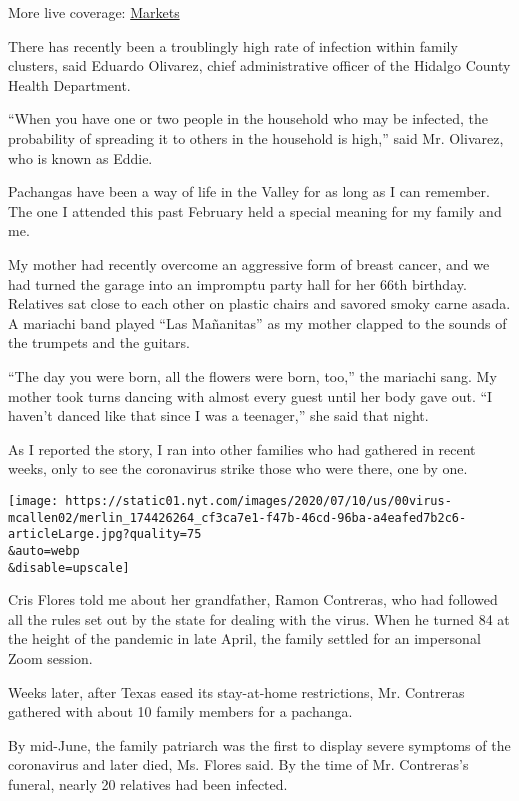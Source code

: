 More live coverage:
\href{https://www.nytimes.com/live/2020/08/04/business/stock-market-today-coronavirus?action=click\&pgtype=Article\&state=default\&region=MAIN_CONTENT_1\&context=storylines_live_updates}{Markets}

There has recently been a troublingly high rate of infection within
family clusters, said Eduardo Olivarez, chief administrative officer of
the Hidalgo County Health Department.

``When you have one or two people in the household who may be infected,
the probability of spreading it to others in the household is high,''
said Mr. Olivarez, who is known as Eddie.

Pachangas have been a way of life in the Valley for as long as I can
remember. The one I attended this past February held a special meaning
for my family and me.

My mother had recently overcome an aggressive form of breast cancer, and
we had turned the garage into an impromptu party hall for her 66th
birthday. Relatives sat close to each other on plastic chairs and
savored smoky carne asada. A mariachi band played ``Las Mañanitas'' as
my mother clapped to the sounds of the trumpets and the guitars.

``The day you were born, all the flowers were born, too,'' the mariachi
sang. My mother took turns dancing with almost every guest until her
body gave out. ``I haven't danced like that since I was a teenager,''
she said that night.

As I reported the story, I ran into other families who had gathered in
recent weeks, only to see the coronavirus strike those who were there,
one by one.

\texttt{[image: https://static01.nyt.com/images/2020/07/10/us/00virus-mcallen02/merlin\_174426264\_cf3ca7e1-f47b-46cd-96ba-a4eafed7b2c6-articleLarge.jpg?quality=75\\\&auto=webp\\\&disable=upscale]}

Cris Flores told me about her grandfather, Ramon Contreras, who had
followed all the rules set out by the state for dealing with the virus.
When he turned 84 at the height of the pandemic in late April, the
family settled for an impersonal Zoom session.

Weeks later, after Texas eased its stay-at-home restrictions, Mr.
Contreras gathered with about 10 family members for a pachanga.

By mid-June, the family patriarch was the first to display severe
symptoms of the coronavirus and later died, Ms. Flores said. By the time
of Mr. Contreras's funeral, nearly 20 relatives had been infected.

